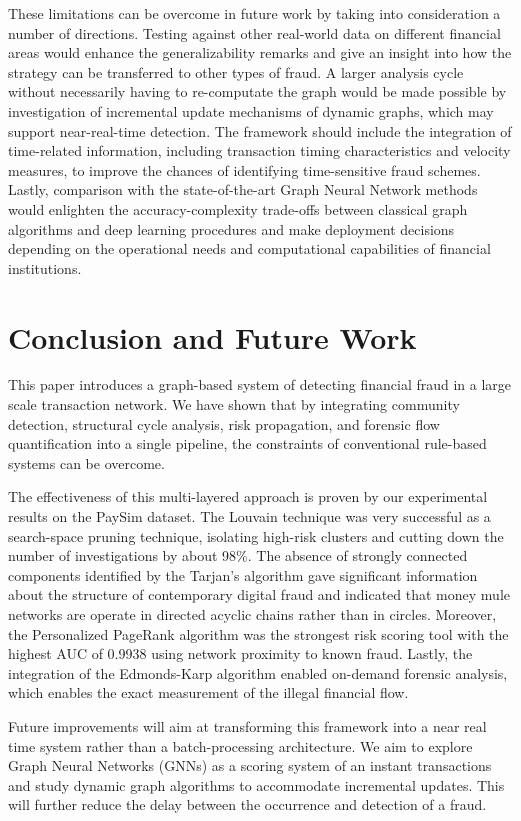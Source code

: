 \documentclass[lettersize,journal]{IEEEtran}
\begin{document}
These limitations can be overcome in future work by taking into consideration a number of directions. Testing against other real-world data on different financial areas would enhance the generalizability remarks and give an insight into how the strategy can be transferred to other types of fraud. A larger analysis cycle without necessarily having to re-computate the graph would be made possible by investigation of incremental update mechanisms of dynamic graphs, which may support near-real-time detection. The framework should include the integration of time-related information, including transaction timing characteristics and velocity measures, to improve the chances of identifying time-sensitive fraud schemes. Lastly, comparison with the state-of-the-art Graph Neural Network methods would enlighten the accuracy-complexity trade-offs between classical graph algorithms and deep learning procedures and make deployment decisions depending on the operational needs and computational capabilities of financial institutions.

\section{Conclusion and Future Work}
This paper introduces a graph-based system of detecting financial fraud in a large scale transaction network. We have shown that by integrating community detection, structural cycle analysis, risk propagation, and forensic flow quantification into a single pipeline, the constraints of conventional rule-based systems can be overcome.

The effectiveness of this multi-layered approach is proven by our experimental results on the PaySim dataset. The Louvain technique was very successful as a search-space pruning technique, isolating high-risk clusters and cutting down the number of investigations by about 98\%. The absence of strongly connected components identified by the Tarjan's algorithm gave significant information about the structure of contemporary digital fraud and indicated that money mule networks are operate in directed acyclic chains rather than in circles. Moreover, the Personalized PageRank algorithm was the strongest risk scoring tool with the highest AUC of 0.9938 using network proximity to known fraud. Lastly, the integration of the Edmonds-Karp algorithm enabled on-demand forensic analysis, which enables the exact measurement of the illegal financial flow.

Future improvements will aim at transforming this framework into a near real time system rather than a batch-processing architecture. We aim to explore Graph Neural Networks (GNNs) as a scoring system of an instant transactions and study dynamic graph algorithms to accommodate incremental updates. This will further reduce the delay between the occurrence and detection of a fraud.
\end{document}

